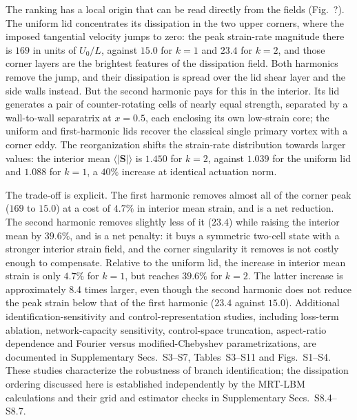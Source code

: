 \documentclass[11pt,a4paper]{article}
\newcommand{\Sij}{\mathbf{S}}
\newenvironment{chgdel}{\par\color{red}}{\par\color{black}}
\begin{document}
\begin{chgdel}
The ranking has a local origin that can be read directly from the fields
(Fig.~?). The uniform lid concentrates its dissipation in the
two upper corners, where the imposed tangential velocity jumps to zero: the peak
strain-rate magnitude there is $169$ in units of $U_0/L$, against $15.0$ for
$k=1$ and $23.4$ for $k=2$, and those corner layers are the brightest features of
the dissipation field. Both harmonics remove the jump, and their dissipation is
spread over the lid shear layer and the side walls instead. But the second
harmonic pays for this in the interior. Its lid generates a pair of
counter-rotating cells of nearly equal strength, separated by a wall-to-wall
separatrix at $x=0.5$, each enclosing its own low-strain core; the uniform and
first-harmonic lids recover the classical single primary vortex with a corner
eddy. The reorganization shifts the strain-rate distribution towards larger
values: the interior mean $\langle|\Sij|\rangle$ is $1.450$ for $k=2$, against
$1.039$ for the uniform lid and $1.088$ for $k=1$, a $40\%$ increase at identical
actuation norm.

The trade-off is explicit. The first harmonic removes almost all of the corner
peak ($169$ to $15.0$) at a cost of $4.7\%$ in interior mean strain, and is a net
reduction. The second harmonic removes slightly less of it ($23.4$) while raising
the interior mean by $39.6\%$, and is a net penalty: it buys a symmetric two-cell
state with a stronger interior strain field, and the corner singularity it removes
is not costly enough to compensate. Relative to the uniform lid, the increase in
interior mean strain is only $4.7\%$ for $k=1$, but reaches $39.6\%$ for $k=2$.
The latter increase is approximately 8.4 times larger, even though the second
harmonic does not reduce the peak strain below that of the first harmonic ($23.4$
against $15.0$). Additional identification-sensitivity and control-representation
studies, including loss-term ablation, network-capacity sensitivity,
control-space truncation, aspect-ratio dependence and Fourier versus
modified-Chebyshev parametrizations, are documented in
Supplementary Secs.~S3--S7, Tables~S3--S11 and Figs.~S1--S4.
These studies characterize the robustness of branch identification;
the dissipation ordering discussed here is established independently
by the MRT-LBM calculations and their grid and estimator checks
in Supplementary Secs.~S8.4--S8.7.
\end{chgdel}
\end{document}
